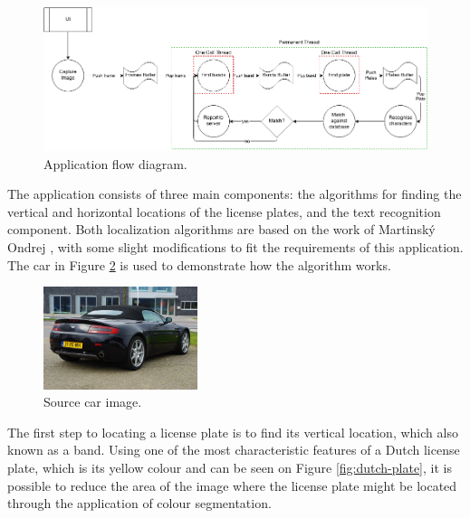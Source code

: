 \begin{figure}[ht]
    \centering
    \includegraphics[width=\textwidth]{plaatjes/architecture-RoadEye-parallel}
    \caption{Application flow diagram.}
    \label{fig:architecture}
\end{figure}%



The application consists of three main components: the algorithms for finding the vertical and horizontal locations of the license plates, and the text recognition component. Both localization algorithms are based on the work of Martinský Ondrej \cite{ondrej2007algorithmic}, with some slight modifications to fit the requirements of this application. The car in Figure \ref{fig:car-source} is used to demonstrate how the algorithm works.

\begin{figure}[ht]
    \centering
    \includegraphics[width=0.40\textwidth]{plaatjes/car}
    \caption{Source car image. \cite{source-car-fig}}
    \label{fig:car-source}
\end{figure}%


The first step to locating a license plate is to find its vertical location, which also known as a band. Using one of the most characteristic features of a Dutch license plate, which is its yellow colour and can be seen on Figure \ref{fig:dutch-plate}, it is possible to reduce the area of the image where the license plate might be located through the application of colour segmentation. 

